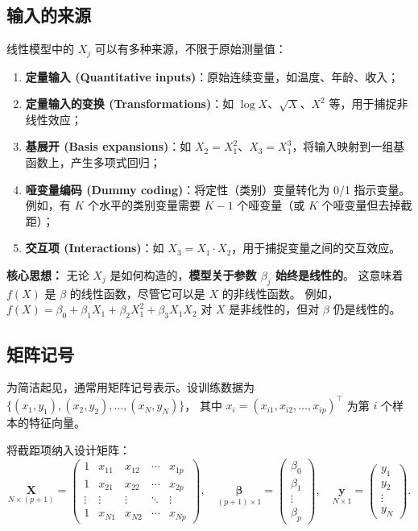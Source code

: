 \subsection{输入的来源}

线性模型中的 $X_j$ 可以有多种来源，不限于原始测量值：

\begin{enumerate}[label=(\arabic*)]
    \item \textbf{定量输入 (Quantitative inputs)}：原始连续变量，如温度、年龄、收入；
    \item \textbf{定量输入的变换 (Transformations)}：如 $\log X$、$\sqrt{X}$、$X^2$ 等，用于捕捉非线性效应；
    \item \textbf{基展开 (Basis expansions)}：如 $X_2 = X_1^2$、$X_3 = X_1^3$，将输入映射到一组基函数上，产生多项式回归；
    \item \textbf{哑变量编码 (Dummy coding)}：将定性（类别）变量转化为 0/1 指示变量。例如，有 $K$ 个水平的类别变量需要 $K-1$ 个哑变量（或 $K$ 个哑变量但去掉截距）；
    \item \textbf{交互项 (Interactions)}：如 $X_3 = X_1 \cdot X_2$，用于捕捉变量之间的交互效应。
\end{enumerate}

\textbf{核心思想：} 无论 $X_j$ 是如何构造的，\textbf{模型关于参数 $\beta_j$ 始终是线性的}。
这意味着 $f(X)$ 是 $\beta$ 的线性函数，尽管它可以是 $X$ 的非线性函数。
例如，$f(X) = \beta_0 + \beta_1 X_1 + \beta_2 X_1^2 + \beta_3 X_1 X_2$ 对 $X$ 是非线性的，但对 $\beta$ 仍是线性的。

\subsection{矩阵记号}

为简洁起见，通常用矩阵记号表示。设训练数据为 $\{(x_1, y_1), (x_2, y_2), \dots, (x_N, y_N)\}$，
其中 $x_i = (x_{i1}, x_{i2}, \dots, x_{ip})^\top$ 为第 $i$ 个样本的特征向量。

将截距项纳入设计矩阵：
\begin{equation}\label{eq:design_matrix}
    \underset{N \times (p+1)}{\mathbf{X}}
    = \begin{pmatrix}
        1 & x_{11} & x_{12} & \cdots & x_{1p} \\
        1 & x_{21} & x_{22} & \cdots & x_{2p} \\
        \vdots & \vdots & \vdots & \ddots & \vdots \\
        1 & x_{N1} & x_{N2} & \cdots & x_{Np}
    \end{pmatrix},
    \quad
    \underset{(p+1) \times 1}{\bm{\beta}}
    = \begin{pmatrix}
        \beta_0 \\ \beta_1 \\ \vdots \\ \beta_p
    \end{pmatrix},
    \quad
    \underset{N \times 1}{\mathbf{y}}
    = \begin{pmatrix}
        y_1 \\ y_2 \\ \vdots \\ y_N
    \end{pmatrix}.
\end{equation}

